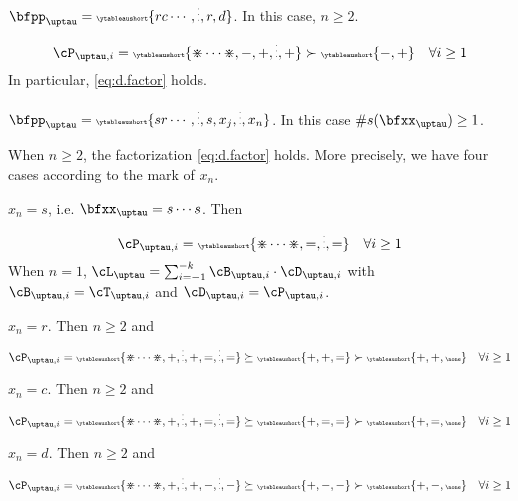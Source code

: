 \documentclass[12pt,a4paper]{amsart}
\makeatletter
\numberwithin{equation}{section}
\theoremstyle{remark}
\let\ytb=\ytableaushort
\newcommand{\tytb}[1]{{\tiny\ytb{#1}}}
\newcommand{\dotminus}{\mathbin{\text{\@dotminus}}}
\newcommand{\@dotminus}{%
  \ooalign{\hidewidth\raise1ex\hbox{.}\hidewidth\cr$\m@th-$\cr}%
}
\def\pcL{\cL^+}
\def\uptaupp{\uptau^{\prime\prime}}
\def\uum{{\dotminus}}
\def\uup{\divideontimes}
\makeatother
\begin{document}
{\begin{enumT}
 \item $\bfpp_{\uptau} = \tytb{rc\cdots,\vdots,r,d}$.
 In this case, $n\geq 2$.
  \begin{equation}\label{eq:rd.c}
  \cP_{\uptau,i}  = \tytb{\uup\cdots\uup,-,+,\vdots,+} \succ \tytb{-,+} \quad  \forall i\geq 1
  \end{equation}
In particular, \eqref{eq:d.factor} holds.
 \item $\bfpp_{\uptau} = \tytb{sr\cdots,\vdots,s,{x_{j}},\vdots,{x_{n}}}$.
 In this case $\#s(\bfxx_{\uptau})\geq 1$.

 When $n\geq 2$, the factorization \eqref{eq:d.factor} holds.
 More precisely, we have four cases according to the mark of $x_{n}$.
 \begin{enumT}
   \item $x_{n}=s$, i.e. $\bfxx_{\uptau} = s\cdots s$. Then
   \[
  \cP_{\uptau,i}  = \tytb{\uup\cdots\uup,=,\vdots,=} \quad \forall i \geq 1
   \]
   When $n= 1$,
   $\cL_{\uptau} = \sum_{i=-1}^{-k} \cB_{\uptau,i}\cdot \cD_{\uptau,i}$
   with $\cB_{\uptau,i} = \cT_{\uptau,i}$ and $\cD_{\uptau,i} = \cP_{\uptau,i}$.
   \item $x_{n}=r$. Then $n\geq 2$ and
   \[
  \cP_{\uptau,i}  = \tytb{\uup\cdots\uup,+,\vdots,+,=,\vdots,=} \succeq \tytb{+,+,=}\succ \tytb{+,+,\none}
  \quad \forall i\geq 1
  \]
   \item $x_{n}=c$. Then $n\geq 2$ and
   \[
  \cP_{\uptau,i}  = \tytb{\uup\cdots\uup,+,\vdots,+,=,\vdots,=} \succeq \tytb{+,=,=}\succ \tytb{+,=,\none}
  \quad \forall i\geq 1
   \]
   \item $x_{n}=d$. Then $n\geq 2$ and
   \[
  \cP_{\uptau,i}  = \tytb{\uup\cdots\uup,+,\vdots,+,-,\vdots,-}  \succeq \tytb{+,-,-}\succ \tytb{+,-,\none}
  \quad \forall i\geq 1
   \]
 \end{enumT}


\end{enumT}}
\end{document}
